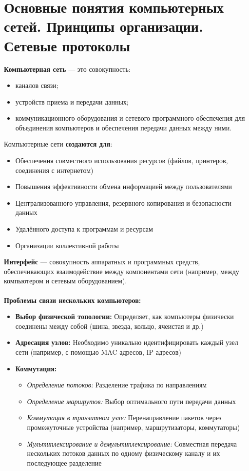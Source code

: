 \documentclass[a4paper, 12pt]{report}
\numberwithin{equation}{section}
\begin{document}
\section{Основные понятия компьютерных сетей. Принципы организации. Сетевые протоколы}
\textbf{Компьютерная сеть} --- это совокупность:
\begin{itemize}
	\item каналов связи;
	\item устройств приема и передачи данных;
	\item коммуникационного оборудования и сетевого программного обеспечения для объединения компьютеров и обеспечения передачи данных между ними.
\end{itemize}
Компьютерные сети \textbf{создаются для}:
\begin{itemize}
	\item Обеспечения совместного использования ресурсов (файлов, принтеров, соединения с интернетом)
	\item Повышения эффективности обмена информацией между пользователями
	\item Централизованного управления, резервного копирования и безопасности данных
	\item Удалённого доступа к программам и ресурсам
	\item Организации коллективной работы
\end{itemize}
\textbf{Интерфейс} --- совокупность аппаратных и программных средств, обеспечивающих взаимодействие между компонентами сети (например, между компьютером и сетевым оборудованием).
\\\\
\textbf{Проблемы связи нескольких компьютеров:}
\begin{itemize}
	\item \textbf{Выбор физической топологии:} Определяет, как компьютеры физически соединены между собой (шина, звезда, кольцо, ячеистая и др.)
	
	\item \textbf{Адресация узлов:} Необходимо уникально идентифицировать каждый узел сети (например, с помощью MAC-адресов, IP-адресов)
	\item \textbf{Коммутация:}
	\begin{itemize}
		\item \textit{Определение потоков:} Разделение трафика по направлениям
		\item \textit{Определение маршрутов:} Выбор оптимального пути передачи данных
		\item \textit{Коммутация в транзитном узле:} Перенаправление пакетов через промежуточные устройства (например, маршрутизаторы, коммутаторы)
		\item \textit{Мультиплексирование и демультиплексирование:} Совместная передача нескольких потоков данных по одному физическому каналу и их последующее разделение
	\end{itemize}
\end{itemize}
\end{document}
